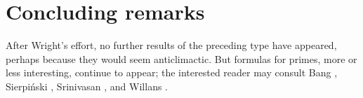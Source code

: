 \documentclass[11pt,reqno]{amsart}
\theoremstyle{redplain}
\numberwithin{equation}{section}
\begin{document}
\section{Concluding remarks}

After Wright's effort, no further results of the preceding type have
appeared, perhaps because they would seem anticlimactic. But formulas for
primes, more or less interesting, continue to appear; the interested
reader may consult Bang \cite{Bang1952}, Sierpi\'nski \cite{Sierpinski1952},
Srinivasan \cite{Srinivasan1961,Srinivasan1962}, and Willans
\cite{Willans1964}.

\begin{center}
\end{center}
\end{document}
